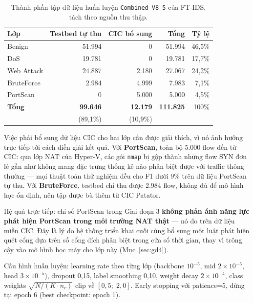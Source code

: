\documentclass[../DoAn.tex]{subfiles}
\begin{document}
\begin{table}[H]
    \centering
    \caption{Thành phần tập dữ liệu huấn luyện \texttt{Combined\_V8\_5} của FT-IDS, tách theo nguồn thu thập.}
    \label{tab:v85-dataset}
    \begin{tabular}{lrrrr}
        \hline
        \textbf{Lớp} & \textbf{Testbed tự thu} & \textbf{CIC bổ sung} & \textbf{Tổng} & \textbf{Tỷ lệ} \\
        \hline
        Benign     & 51.994 &      0 &  51.994 & 46,5\% \\
        DoS        & 19.781 &      0 &  19.781 & 17,7\% \\
        Web Attack & 24.887 &  2.180 &  27.067 & 24,2\% \\
        BruteForce &  2.984 &  4.999 &   7.983 &  7,1\% \\
        PortScan   &      0 &  5.000 &   5.000 &  4,5\% \\
        \hline
        \textbf{Tổng} & \textbf{99.646} & \textbf{12.179} & \textbf{111.825} & 100\% \\
                      & (89,1\%)        & (10,9\%)        &                  & \\
        \hline
    \end{tabular}
\end{table}

Việc phải bổ sung dữ liệu CIC cho hai lớp cần được giải thích, vì nó ảnh hưởng trực tiếp tới cách diễn giải kết quả. Với \textbf{PortScan}, toàn bộ 5.000 flow đến từ CIC: qua lớp NAT của Hyper-V, các gói \texttt{nmap} bị gộp thành những flow SYN đơn lẻ gần như không mang đặc trưng thống kê nào phân biệt được với traffic thông thường --- mọi thuật toán thử nghiệm đều cho F1 dưới 9\% trên dữ liệu PortScan tự thu. Với \textbf{BruteForce}, testbed chỉ thu được 2.984 flow, không đủ để mô hình học ổn định, nên tập được bù thêm từ CIC Patator.

Hệ quả trực tiếp: chỉ số PortScan trong Giai đoạn 3 \textbf{không phản ánh năng lực phát hiện PortScan trong môi trường NAT thật} --- nó đo trên dữ liệu miền CIC. Đây là lý do hệ thống triển khai cuối cùng bổ sung một luật phát hiện quét cổng dựa trên số cổng đích phân biệt trong cửa sổ thời gian, thay vì trông cậy vào mô hình học máy cho lớp này (Mục~\ref{sec:gd4}).

Cấu hình huấn luyện: learning rate theo từng lớp (backbone $10^{-5}$, mid $2 \times 10^{-5}$, head $3 \times 10^{-5}$), dropout 0,15, label smoothing 0,10, weight decay $2 \times 10^{-4}$, class weights $\sqrt{N/(K \cdot n_c)}$ clip về $[0{,}5;\; 2{,}0]$. Early stopping với patience=5, dừng tại epoch 6 (best checkpoint: epoch 1).
\end{document}
